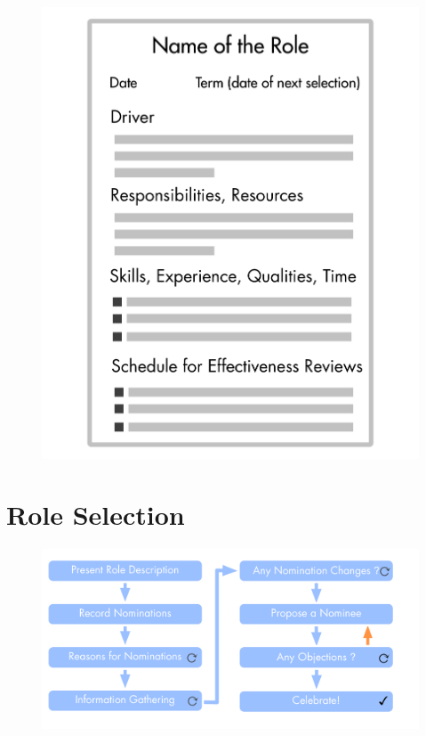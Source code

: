 \begin{figure}[htbp]
\centering
\includegraphics[keepaspectratio,width=\textwidth,height=0.75\textheight]{img/people-and-roles/role-description-template.png}
\end{figure}

\section{Role Selection}
\label{roleselection}

\begin{figure}[htbp]
\centering
\includegraphics[keepaspectratio,width=\textwidth,height=0.75\textheight]{img/people-and-roles/selection.png}
\end{figure}

